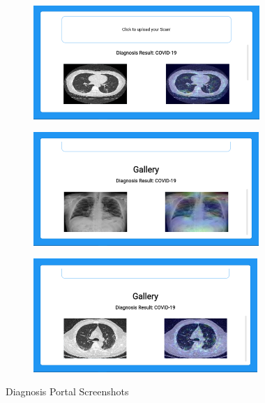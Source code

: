 \begin{figure}[H]
\begin{subfigure}[b]{0.5\textwidth}
        \end{subfigure}%
        \begin{subfigure}[b]{0.5\textwidth}
                \includegraphics[width=\linewidth, height=4.3cm]{Images/Website Screenshot 8.png}
        \end{subfigure}%
        \vspace{0.8em}
        \begin{subfigure}[b]{0.5\textwidth}
                \includegraphics[width=\linewidth, height=4.3cm]{Images/Website Screenshot 2.png}
        \end{subfigure}%
        \begin{subfigure}[b]{0.5\textwidth}
                \includegraphics[width=\linewidth, height=4.3cm]{Images/Website Screenshot 3.png}
        \end{subfigure}%
        \caption{Diagnosis Portal Screenshots}\label{fig:portalScreenshots}
\end{figure}